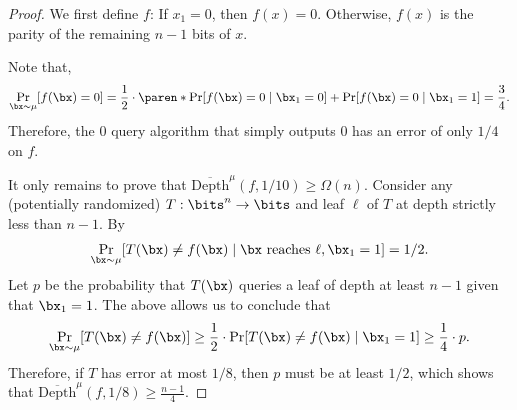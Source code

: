 \begin{proof}
    We first define $f$: If $x_1 = 0$, then $f(x) = 0$. Otherwise, $f(x)$ is the parity of the remaining $n-1$ bits of $x$.

    Note that,
    \begin{equation*}
        \Pr_{\bx \sim \mu}[f(\bx) = 0] = \frac{1}{2} \cdot \paren*{\Pr[f(\bx) = 0 \mid \bx_1 = 0] + \Pr[f(\bx) = 0 \mid \bx_1 = 1]} = \frac{3}{4}.
    \end{equation*}
    Therefore, the $0$ query algorithm that simply outputs $0$ has an error of only $1/4$ on $f$. 
    
    It only remains to prove that $\overline{\mathrm{Depth}}^{\mu}(f,1/10) \geq \Omega(n)$. Consider any (potentially randomized) $T:\bits^n \to \bits$ and leaf $\ell$ of $T$ at depth strictly less than $n-1$. By 
    \begin{equation*}
        \Pr_{\bx \sim \mu}[T(\bx) \neq f(\bx) \mid \bx \text{ reaches } \ell, \bx_1 = 1] = 1/2.
    \end{equation*}
    Let $p$ be the probability that $T(\bx)$ queries a leaf of depth at least $n-1$ given that $\bx_1 = 1$. The above allows us to conclude that
    \begin{equation*}
        \Pr_{\bx \sim \mu}[T(\bx) \neq f(\bx)] \geq \frac{1}{2} \cdot \Pr[T(\bx) \neq f(\bx)\mid \bx_1 = 1] \geq \frac{1}{4} \cdot p. 
    \end{equation*}
    Therefore, if $T$ has error at most $1/8$, then $p$ must be at least $1/2$, which shows that $\overline{\mathrm{Depth}}^{\mu}(f,1/8) \geq \frac{n-1}{4}$.
\end{proof}